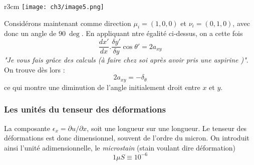        \begin{wrapfigure}[9]{r}{3cm}
        \texttt{[image: ch3/image5.png]}
        \end{wrapfigure}
        Considérons maintenant comme direction $\mu_i = (1,0,0)$ et $\nu_i=(0,1,0)$, avec donc 
        un angle de $90\ \deg$. En appliquant ntre égalité ci-dessus, on a cette fois 
        \begin{equation}
        \dfrac{dx'}{dx}.\dfrac{\delta y'}{\delta y}\cos\theta' = 2a_{xy}
        \end{equation}
        \textit{"Je vous fais grâce des calculs (à faire chez soi après avoir pris une aspirine
        )"}. On trouve dès lors :
        \begin{equation}
        2a_{xy} = -\delta_\theta
        \end{equation}
        ce qui montre une diminution de l'angle initialement droit entre $x$ et $y$. 
        
        
        \subsubsection{Les unités du tenseur des déformations}
        La composante $\epsilon_x = \partial u/\partial x$, soit une longueur sur une longueur.
        Le tenseur des déformations est donc dimensionnel, souvent de l'ordre du micron. On 
        introduit ainsi l'unité adimensionnelle, le \textit{microstain} (stain voulant dire
        déformation)
        \begin{equation}
        1\mu S \equiv 10^{-6}
        \end{equation}